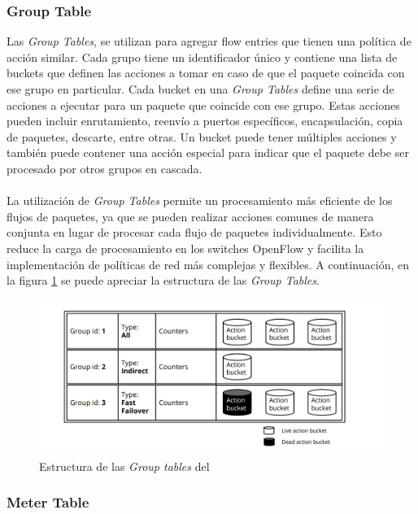 \subsubsection{Group Table}

Las \textit{Group Tables}, se utilizan para agregar flow entries que tienen una política de acción similar. Cada grupo tiene un identificador único y contiene una lista de buckets que definen las acciones a tomar en caso de que el paquete coincida con ese grupo en particular. Cada bucket en una \textit{Group Tables} define una serie de acciones a ejecutar para un paquete que coincide con ese grupo. Estas acciones pueden incluir enrutamiento, reenvío a puertos específicos, encapsulación, copia de paquetes, descarte, entre otras. Un bucket puede tener múltiples acciones y también puede contener una acción especial para indicar que el paquete debe ser procesado por otros grupos en cascada. \\
\\
La utilización de \textit{Group Tables} permite un procesamiento más eficiente de los flujos de paquetes, ya que se pueden realizar acciones comunes de manera conjunta en lugar de procesar cada flujo de paquetes individualmente. Esto reduce la carga de procesamiento en los switches OpenFlow y facilita la implementación de políticas de red más complejas y flexibles. A continuación, en la figura \ref{fig:bofuss4} se puede apreciar la estructura de las \textit{Group Tables}.

\begin{figure}[ht]
    \centering
    \includegraphics[width=\textwidth]{archivos/img/teoria/bofuss4.png}
    \caption{Estructura de las \textit{Group tables} del  \cite{fernandes2015software}}
    \label{fig:bofuss4}
\end{figure}


\subsubsection{Meter Table}

